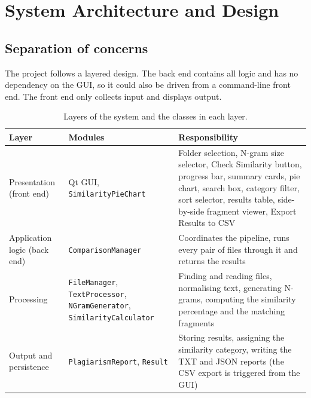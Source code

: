 \documentclass[12pt,a4paper,oneside]{book}
\begin{document}
\section{System Architecture and Design}
\subsection{Separation of concerns}
The project follows a layered design. The back end contains all logic and has no dependency on the GUI, so it could also be driven from a command-line front end. The front end only collects input and displays output.

\begin{table}[H]
\centering
\small
\begin{tabular}{@{}p{3.2cm}p{3.6cm}p{6.6cm}@{}}
\toprule
Layer & Modules & Responsibility \\
\midrule
Presentation (front end) & Qt GUI, \texttt{SimilarityPieChart} & Folder selection, N-gram size selector, Check Similarity button, progress bar, summary cards, pie chart, search box, category filter, sort selector, results table, side-by-side fragment viewer, Export Results to CSV \\
Application logic (back end) & \texttt{ComparisonManager} & Coordinates the pipeline, runs every pair of files through it and returns the results \\
Processing & \texttt{FileManager}, \texttt{TextProcessor}, \texttt{NGramGenerator}, \texttt{SimilarityCalculator} & Finding and reading files, normalising text, generating N-grams, computing the similarity percentage and the matching fragments \\
Output and persistence & \texttt{PlagiarismReport}, \texttt{Result} & Storing results, assigning the similarity category, writing the TXT and JSON reports (the CSV export is triggered from the GUI) \\
\bottomrule
\end{tabular}
\caption{Layers of the system and the classes in each layer.}
\label{tab:layers}
\end{table}
\end{document}
